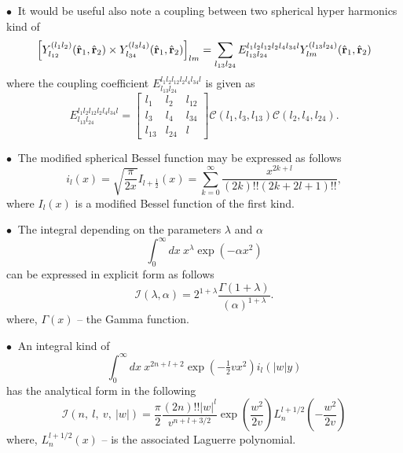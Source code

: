 $\bullet~$ It would be useful also note a coupling between two spherical hyper harmonics kind of
\begin{equation}
\left[ Y^{(l_1l_2)}_{l_{12}}(\hat{{\bf r}}_1,\hat{{\bf r}}_2) \times Y^{(l_3l_4)}_{l_{34}}(\hat{{\bf r}}_1,\hat{{ \bf r}}_2) \right]_{lm}= \sum_{l_{13}l_{24}} {E}^{l_1l_2l_{12}l_2l_4l_{34}l}_{l_{13}l_{24}}  Y^{(l_{13}l_{24})}_{lm}(\hat{{\bf r}}_1,\hat{{\bf r}}_2)
\end{equation}
where the coupling coefficient ${E}^{l_1l_2l_{12}l_2l_4l_{34}l}_{l_{13}l_{24}}$ is given as
\begin{equation}
\label{hyperSphTrans}
{E}^{l_1l_2l_{12}l_2l_4l_{34}l}_{l_{13}l_{24}} = 
\begin{bmatrix}
l_1 & l_2 & l_{12} \\ 
l_3 & l_4 & l_{34} \\ 
l_{13} & l_{24} & l
\end{bmatrix}
\mathcal{C}(l_1,l_3,l_{13})\mathcal{C}(l_2,l_4,l_{24}).
\end{equation}

$\bullet~$ The modified spherical Bessel function may be expressed as follows
\begin{equation}
i_l(x)=\sqrt{\frac{\pi}{2 x}} I_{l+\tfrac{1}{2}}(x)
=\sum_{k=0}^{\infty} \frac{x^{2k+l}}{(2k)!!(2k+2l+1)!!},
\label{mod_sph_bessel}
\end{equation} 
where $I_{l}(x)$ is a modified Bessel function of the first kind.

$\bullet~$ The integral depending on the parameters $\lambda$ and $\alpha$ 
\begin{equation*}
\int_0^\infty dx~ x^{\lambda} 
\exp \left( - \alpha x^2 \right)
\end{equation*}
can be expressed in explicit form as follows
\begin{equation}
\mathcal{I} \left( \lambda,\alpha \right)=
 2^{1+\lambda}\frac{\Gamma \left( 1+\lambda \right)  }{ \left( \alpha \right) ^{1+\lambda}} .
\label{table_integral_1}
\end{equation}
where, $\Gamma(x)$ -- the Gamma function.

$\bullet~$  An integral kind of
\begin{equation*}
\int_0^\infty dx~ x^{2n+l+2} 
\exp \left(- \tfrac{1}{2} v x^2 \right)
i_{l}(|w|y)
\end{equation*}
 has the analytical form in the following
\begin{equation}
\mathcal{I}(n,~l,~v,~|w|) = 
\frac{\pi}{2}\frac{(2n)!! |w|^l}{v^{n+l+3/2}}
\exp\left( \frac{w^2}{2v} \right)
L^{l+1/2}_{n} \left( -\frac{w^2}{2v}\right)
\label{table_integral_2}
\end{equation} 
 where, $L_n^{l+1/2}(x)$ -- is the associated Laguerre polynomial.

